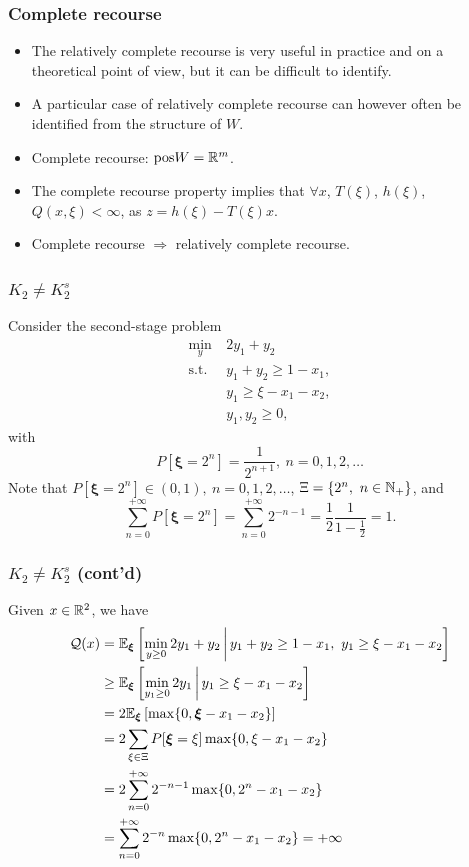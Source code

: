 \documentclass{beamer}
\def\bxi{\boldsymbol\xi}
\def\bxi{\boldsymbol\xi}
\begin{document}
\begin{frame}
\frametitle{Complete recourse}
	
\begin{itemize}
	\item 
	The relatively complete recourse is very useful in practice and on a theoretical point of view, but it can be difficult to identify.
	\item 
	A particular case of relatively complete recourse can however often be identified from the structure of $W$.
\item
	{\red Complete recourse}: $\text{pos}W = {\mathbb{R}}^m$.
\item
	The complete recourse property implies that $\forall x$, $T(\xi)$, $h(\xi)$, $Q(x,\xi) < \infty$, as $z = h(\xi)-T(\xi)x$.
	\item
	Complete recourse $\Rightarrow$ relatively complete recourse.
\end{itemize}

\end{frame}

\begin{frame}
\frametitle{$K_2 \ne K_2^s$}

Consider the second-stage problem
\begin{align*}
	\min_y\ & 2y_1+y_2\\
	\mbox{s.t. } & y_1 + y_2 \geq 1 - x_1,\\
	& y_1 \geq \xi - x_1 - x_2,\\
	& y_1, y_2 \geq 0,
\end{align*}
with
$$
P\left[ \bxi = 2^n \right] = \frac{1}{2^{n+1}},\ n = 0,1,2,\ldots
$$
Note that $P\left[ \bxi = 2^n \right] \in (0,1),\ n = 0,1,2,\ldots$, $\Xi = \lbrace 2^n,\ n \in {\mathbb{N}}_+ \rbrace$, and
$$
\sum_{n=0}^{+\infty} P\left[ \bxi = 2^n \right] = \sum_{n=0}^{+\infty} 2^{-n-1} = \frac{1}{2} \frac{1}{1-\frac{1}{2}} = 1.
$$

\end{frame}

\begin{frame}
\frametitle{$K_2 \ne K_2^s$ (cont'd)}

Given $x \in {\mathbb{R}}^2$, we have
\begin{align*}
\calQ(x) &= \EE_{\bxi} \left[ \min_{y \geq 0} 2y_1+y_2 \,\bigg|\, y_1 + y_2 \geq 1 - x_1,\ y_1 \geq \xi - x_1 - x_2 \right] \\
&\geq \EE_{\bxi} \left[ \min_{y_1 \geq 0} 2y_1 \,\bigg|\, y_1 \geq \xi - x_1 - x_2 \right] \\
& = 2 \EE_{\bxi} \left[ \max \{ 0, \bxi - x_1 - x_2 \}\right] \\
& = 2 \sum_{\xi \in \Xi} P[\bxi = \xi] \max \{ 0, \xi - x_1 - x_2 \} \\
& = 2 \sum_{n = 0}^{+\infty} 2^{-n-1} \max \{ 0, 2^n - x_1 - x_2 \} \\
& = \sum_{n = 0}^{+\infty} 2^{-n} \max \{ 0, 2^n - x_1 - x_2 \} = +\infty
\end{align*}

\end{frame}
\end{document}

